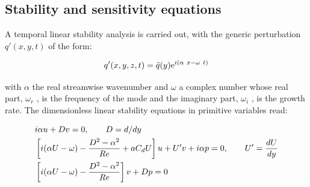 \subsection{Stability and sensitivity equations}
\label{sec2b}
A temporal linear stability analysis is carried out, with the generic perturbation $q'(x, y,t)$ of the
form:

\begin{equation}
q'(x,y,z,t)=\tilde q(y){\rm e}^{i(\alpha \  x -\omega \ t)}
\label{eq:q}
\end{equation}

with $\alpha$ the real streamwise wavenumber and $\omega$ a complex number whose real part, $\omega_r$ , is the frequency of the mode and the imaginary part, $\omega_i$ , is the growth rate. The dimensionless linear stability
equations in primitive variables read:

\begin{equation}
\begin{split}
& i\alpha u + D v =0,  \qquad D=d/dy \vspace{0.3cm}\\
& \left [ i (\alpha U -\omega)   - \frac{D^2-\alpha^2}{Re}+ a C_d U \right] u + U' v + i \alpha p  = 0,  \qquad U'=\dfrac{d U}{dy} \vspace{0.3cm} \\
& \left[ i (\alpha U -\omega)   - \frac{D^2-\alpha^2}{Re} \right ] v + D p   = 0
\label{eq:uvp}
\end{split}
\end{equation}

